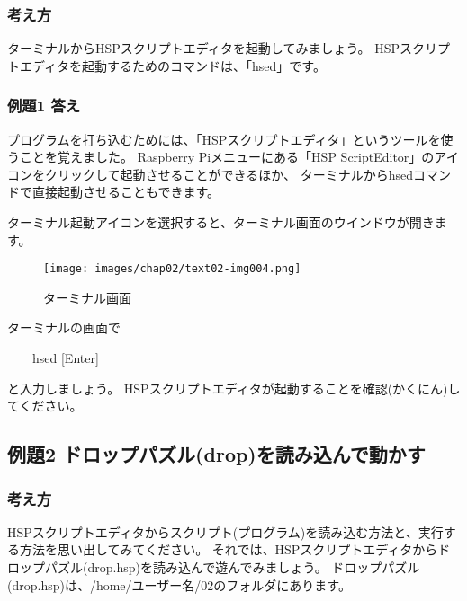 \subsubsection*{考え方}

ターミナルからHSPスクリプトエディタを起動してみましょう。
HSPスクリプトエディタを起動するためのコマンドは、「hsed」です。

\subsubsection*{例題1 答え}

プログラムを打ち込むためには、「HSPスクリプトエディタ」というツールを使うことを覚えました。
Raspberry Piメニューにある「HSP ScriptEditor」のアイコンをクリックして起動させることができるほか、
ターミナルからhsedコマンドで直接起動させることもできます。

ターミナル起動アイコンを選択すると、ターミナル画面のウインドウが開きます。

\begin{figure}[H]
  \begin{center}
    \texttt{[image: images/chap02/text02-img004.png]}
    \caption{ターミナル画面}
  \end{center}
  \label{fig:terminal}
\end{figure}

ターミナルの画面で

\vspace{1em}
\ \ \ \ hsed [Enter]
\vspace{1em}

\noindent
と入力しましょう。
HSPスクリプトエディタが起動することを確認(かくにん)してください。
\clearpage

% 
% 
% 
\subsection{例題2 ドロップパズル(drop)を読み込んで動かす}

\subsubsection*{考え方}

HSPスクリプトエディタからスクリプト(プログラム)を読み込む方法と、実行する方法を思い出してみてください。
それでは、HSPスクリプトエディタからドロップパズル(drop.hsp)を読み込んで遊んでみましょう。
ドロップパズル(drop.hsp)は、/home/ユーザー名/02のフォルダにあります。

